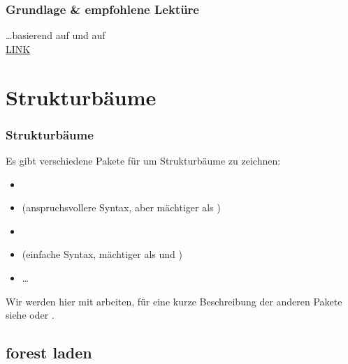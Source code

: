 \begin{frame}
\frametitle{Grundlage \& empfohlene Lektüre}

\dots basierend auf \citet{Freitag&MyP15a} und auf \citet{MyP&Kerkhof16a}\\
\ras \href{https://www.researchgate.net/publication/279514740_LATEX-Einfuhrung_fur_Linguisten}{LINK}

\end{frame}


\section{Strukturbäume}

\begin{frame}[fragile]
\frametitle{Strukturbäume}

Es gibt verschiedene Pakete für um Strukturbäume zu zeichnen:

\begin{itemize}
	\item {}
	\item {} (anspruchsvollere Syntax, aber mächtiger als )
	\item {}
	\item \alert{} (einfache Syntax, mächtiger als  und )
	\item \dots 
\end{itemize}

Wir werden hier mit  arbeiten, für eine kurze Beschreibung der anderen Pakete siehe \citet{Freitag&MyP15a} oder \citet{Linke05a}.
\end{frame}


\subsection{forest laden}

